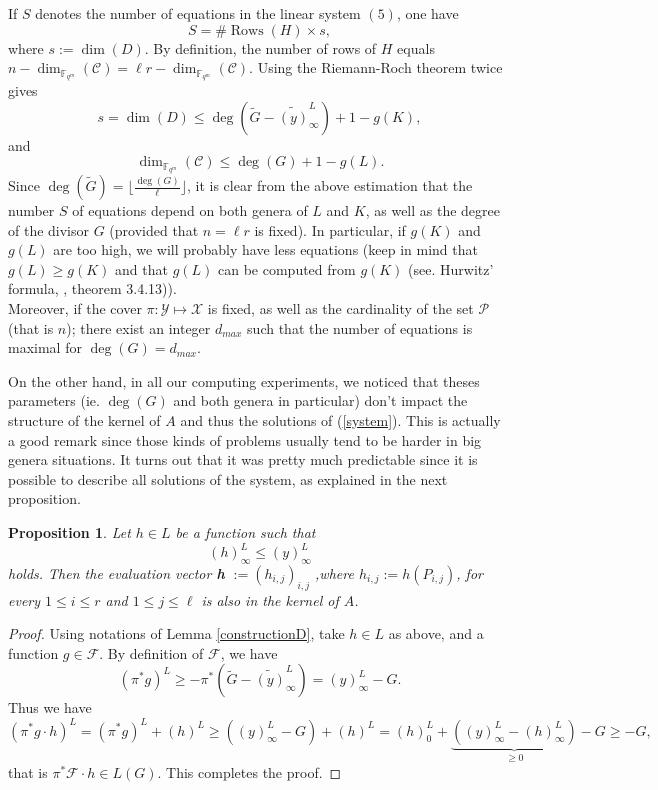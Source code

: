 \documentclass[10pt]{article}
\newtheorem{prop1}[thm]{Proposition}
\newcommand{\s}{\vspace{0.3cm}}
\newcommand{\cd}{\cdot}
\newcommand{\fqm}{\mathbb{F}_{q^m}}
\newcommand{\fq}{\mathbb{F}_q}
\newcommand{\X}{\mathcal{X}}
\newcommand{\Y}{\mathcal{Y}}
\newcommand{\PR}{\mathcal{P}}
\newcommand{\hugues}[1]{\textcolor{blue}{#1}}
\newcommand{\notehugues}[1]{\marginpar{\small\hugues{#1}}}
\begin{document}
\s 

If $S$ denotes the number of equations in the linear system $(5)$, one have 
\[S = \#\operatorname{Rows}(H) \times s,\]
where $s := \dim( D)$. By definition, the number of rows of $H$ equals $n-\dim_{\fqm}(\mathcal{C})= \ell r - \dim_{\fqm}(\mathcal{C})$.
\notehugues{dimension sur $\fqm$ ou sur $\fq$~?}
Using the Riemann-Roch theorem  twice gives 
\[s = \dim ( D) \leq \deg\left( \tilde{G}-\widetilde{(y)}^L_{\infty}\right) +1 -  g(K) ,\]
and
\[\dim_{\fqm}(\mathcal{C}) \leq \deg(G)+1-g(L).\]
Since $\deg(\tilde{G}) = \lfloor \frac{\deg(G)}{\ell} \rfloor$, it is clear from the above estimation that the number $S$ of equations depend on both genera of $L$ and $K$, as well as the degree of the divisor $G$ (provided that $n=\ell r$ is fixed). In particular, if $g(K)$ and $g(L)$ are too high, we will probably have less equations (keep in mind that $g(L) \geq g(K)$ and that $g(L)$ can be computed from $g(K)$ (see. Hurwitz' formula, \cite{Sti}, theorem 3.4.13)). \\
Moreover, if the cover $\pi : \Y \longmapsto \X$ is fixed, as well as the cardinality of the set $\PR$ (that is $n$); there exist an integer $d_{max}$ such that the number of equations is maximal for $\deg(G)=  d_{max}$. 

\s

On the other hand, in all our computing experiments, we noticed that theses parameters (ie. $\deg(G)$ and both genera in particular) don't impact the structure of the kernel of $A$ and thus the solutions of (\ref{system}). This is actually a good remark\notehugues{que veux-tu dire~?} since those kinds of problems usually tend to be harder in big genera situations. It turns out that it was pretty much predictable since it is possible to describe all solutions of the system, as explained in the next proposition. 

\s

\begin{prop1} \label{othersolutions}
Let $h \in L$ be a function such that 
\[ (h)^L_{\infty} \leq (y)^L_{\infty}\]
holds. Then the evaluation vector \textbf{h} $ := (h_{i,j})_{i,j}$ ,where $h_{i,j} := h(P_{i,j})$, for every $1 \leq i \leq r$ and $1 \leq j \leq \ell$ is also in the kernel of $A$.
\end{prop1}

\s

\begin{proof}
Using notations of Lemma \ref{constructionD}, take $h \in L$ as above, and a function $g \in \mathcal{F}$. By definition of $\mathcal{F}$, we have 
\[(\pi^*g)^L \geq -\pi^*\left(\tilde{G}-\widetilde{(y)}^L_{\infty}\right) = (y)^L_{\infty} - G.\]
Thus we have 
\[(\pi^*g \cd h)^L = (\pi^*g)^L  + (h)^L \geq  ((y)^L_{\infty} - G)+(h)^L = (h)^L_0 + \underbrace{((y)^L_{\infty}-(h)^L_{\infty})}_{\geq 0} - G \geq -G,\]
that is $\pi^*\mathcal{F}\cd h \in L(G)$. This completes the proof.

\end{proof}
\end{document}
